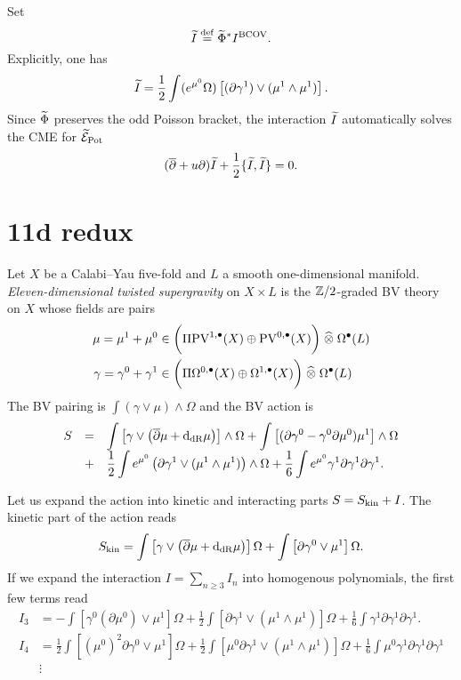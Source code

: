 \documentclass[11pt]{amsart}
\def\PV{{\rm PV}}
\begin{document}
Set
\[
\Tilde{I} \define \Tilde{\Phi}^* I^{\rm BCOV} .
\]
Explicitly, one has
\[
\Tilde{I} = \frac12 \int (e^{\mu^0} \Omega) \left[ (\partial \gamma^1) \vee (\mu^1 \wedge \mu^1) \right].
\]
Since $\Tilde{\Phi}$ preserves the odd Poisson bracket, the interaction $\Tilde{I}$ automatically solves the CME for $\Tilde{\cE}_{\rm Pot}$
\[
(\dbar + u \partial) \Tilde{I} + \frac12 \{\Tilde{I}, \Tilde{I}\} = 0 .
\]

\section{11d redux}

\begin{dfn} \label{dfn:classical}
Let $X$ be a Calabi--Yau five-fold and $L$ a smooth one-dimensional manifold.
{\em Eleven-dimensional twisted supergravity} on $X \times L$ is the $\ZZ/2$-graded BV theory on $X$ whose fields are pairs
\begin{align*}
\mu = \mu^1 + \mu^0 & \in \bigg(\Pi \PV^{1,\bu}(X) \oplus \PV^{0,\bu}(X) \bigg) \; \Hat{\otimes} \; \Omega^{\bu}(L) \\
\gamma = \gamma^0 + \gamma^1 & \in \bigg(\Pi \Omega^{0,\bu}(X) \oplus \Omega^{1,\bu} (X) \bigg) \; \Hat{\otimes} \; \Omega^{\bu}(L) 
\end{align*}
The BV pairing is $\int (\gamma \vee \mu) \wedge \Omega$ and the BV action is
\begin{equation}\label{eqn:bvaction}
\begin{array}{lllllll}
S & = & \displaystyle \int \left[\gamma \vee \left(\dbar \mu + \d_{\dR} \mu\right) \right] \wedge \Omega  + \int \left[(\partial \gamma^0 - \gamma^0 \partial \mu^0) \mu^1 \right] \wedge \Omega \\ & + &  \displaystyle \frac12 \int e^{\mu^0} \left(\partial \gamma^1 \vee (\mu^1 \wedge \mu^1) \right) \wedge \Omega  + \frac16 \int e^{\mu^0} \gamma^1 \partial \gamma^1 \partial \gamma^1 .
\end{array}
\end{equation}
\end{dfn}

Let us expand the action into kinetic and interacting parts $S = S_{\rm kin} + I$.
The kinetic part of the action reads 
\[
S_{\rm kin} = \int \left[\gamma \vee \left(\dbar \mu + \d_{\dR} \mu\right) \right] \Omega  + \int \left[\partial \gamma^0 \vee \mu^1 \right] \Omega .
\]
If we expand the interaction $I = \sum_{n \geq 3} I_n$ into homogenous polynomials, the first few terms read
\begin{align*}
I_3 & = - \int \left[\gamma^0 (\partial \mu^0) \vee \mu^1\right] \Omega + \frac12 \int \left[\partial \gamma^1 \vee (\mu^1 \wedge \mu^1)\right] \Omega + \frac16 \int \gamma^1 \partial \gamma^1 \partial \gamma^1 . \\
I_4 & = \frac12 \int \left[ (\mu^0)^2 \partial \gamma^0 \vee \mu^1 \right] \Omega + \frac12 \int \left[ \mu^0 \partial \gamma^1 \vee (\mu^1 \wedge \mu^1) \right] \Omega + \frac16 \int \mu^0 \gamma^1 \partial \gamma^1 \partial \gamma^1 \\
& \vdots 
\end{align*} 
\end{document}
